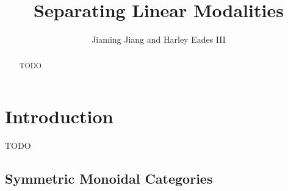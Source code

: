\documentclass{article}
\date{}
\begin{document}
\title{Separating Linear Modalities}
\author{Jiaming Jiang and Harley Eades III}
\date{}

\maketitle 

\begin{abstract}

  TODO

\end{abstract}

\section{Introduction}
\label{sec:introduction}
TODO \cite{Benton:1994}

\subsection{Symmetric Monoidal Categories}
\label{subsec:symmetric_monoidal_categories}
\end{document}

